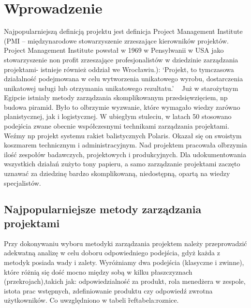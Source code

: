 
\chapter{Wprowadzenie}

Najpopularniejszą definicją projektu jest definicja Project Management Institute (PMI – międzynarodowe stowarzyszenie zrzeszające kierowników projektów.
Project Management Institute powstał w 1969 w Pensylwanii w USA jako stowarzyszenie non profit zrzeszające profesjonalistów
w dziedzinie zarządzania projektami- istnieje również oddział we Wrocławiu.): 
`Projekt, to tymczasowa działalność podejmowana w celu wytworzenia unikatowego wyrobu,
dostarczenia unikatowej usługi lub otrzymania unikatowego rezultatu.'
~\cite{PMI_2000}
Już w starożytnym Egipcie istniały metody zarządzania skomplikowanym przedsięwzięciem,
np budowa piramid. Było to olbrzymie wyzwanie, które wymagało wiedzy zarówno planistycznej,
jak i logistycznej. W ubiegłym stuleciu, w latach 50 stosowano podejścia zwane obecnie współczesnymi
technikami zarządzania projektami. Weźmy np projekt systemu rakiet balistycznych Polaris.
Okazał się on swoistym koszmarem technicznym i administracyjnym. Nad projektem pracowała olbrzymia ilość zespołów badawczych,
projektowych i produkcyjnych. Dla udokumentowania wszystkich działań zużyto tony papieru, a samo zarządzanie projektami zaczęto
uznawać za dziedzinę bardzo skomplikowaną, niedostępną, opartą na wiedzy specjalistów.\cite{Stanley_2013}

\section{Najpopularniejsze metody zarządzania projektami}
Przy dokonywaniu wyboru metodyki zarządzania projektem należy przeprowadzić adekwatną analizę w celu doboru odpowiedniego podejścia,
gdyż każda z metodyk posiada wady i zalety. Wyróżniamy dwa podejścia (klasyczne i zwinne), które różnią się dość mocno między sobą w kilku płaszczyznach (przekrojach),takich jak:
odpowiedzialność za produkt, rola menedżera w zespole, istota prac wstępnych, zdefiniowanie produktu czy odpowiedź zwrotna użytkowników.
Co uwzględniono w tabeli \~ref{tabela:roznice}.

